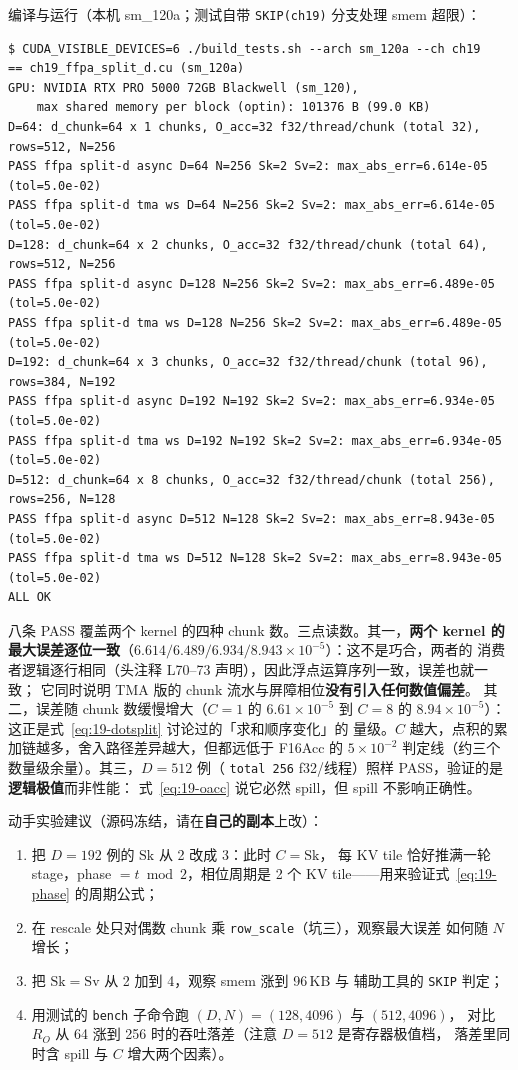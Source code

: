 编译与运行（本机 sm\_120a；测试自带 \texttt{SKIP(ch19)} 分支处理 smem 超限）：

\begin{lstlisting}[style=console]
$ CUDA_VISIBLE_DEVICES=6 ./build_tests.sh --arch sm_120a --ch ch19
== ch19_ffpa_split_d.cu (sm_120a)
GPU: NVIDIA RTX PRO 5000 72GB Blackwell (sm_120),
    max shared memory per block (optin): 101376 B (99.0 KB)
D=64: d_chunk=64 x 1 chunks, O_acc=32 f32/thread/chunk (total 32), rows=512, N=256
PASS ffpa split-d async D=64 N=256 Sk=2 Sv=2: max_abs_err=6.614e-05 (tol=5.0e-02)
PASS ffpa split-d tma ws D=64 N=256 Sk=2 Sv=2: max_abs_err=6.614e-05 (tol=5.0e-02)
D=128: d_chunk=64 x 2 chunks, O_acc=32 f32/thread/chunk (total 64), rows=512, N=256
PASS ffpa split-d async D=128 N=256 Sk=2 Sv=2: max_abs_err=6.489e-05 (tol=5.0e-02)
PASS ffpa split-d tma ws D=128 N=256 Sk=2 Sv=2: max_abs_err=6.489e-05 (tol=5.0e-02)
D=192: d_chunk=64 x 3 chunks, O_acc=32 f32/thread/chunk (total 96), rows=384, N=192
PASS ffpa split-d async D=192 N=192 Sk=2 Sv=2: max_abs_err=6.934e-05 (tol=5.0e-02)
PASS ffpa split-d tma ws D=192 N=192 Sk=2 Sv=2: max_abs_err=6.934e-05 (tol=5.0e-02)
D=512: d_chunk=64 x 8 chunks, O_acc=32 f32/thread/chunk (total 256), rows=256, N=128
PASS ffpa split-d async D=512 N=128 Sk=2 Sv=2: max_abs_err=8.943e-05 (tol=5.0e-02)
PASS ffpa split-d tma ws D=512 N=128 Sk=2 Sv=2: max_abs_err=8.943e-05 (tol=5.0e-02)
ALL OK
\end{lstlisting}

八条 PASS 覆盖两个 kernel 的四种 chunk 数。三点读数。其一，\textbf{两个 kernel 的
最大误差逐位一致}（$6.614/6.489/6.934/$\allowbreak$8.943\times10^{-5}$）：这不是巧合，两者的
消费者逻辑逐行相同（头注释 L70--73 声明），因此浮点运算序列一致，误差也就一致；
它同时说明 TMA 版的 chunk 流水与屏障相位\textbf{没有引入任何数值偏差}。
其二，误差随 chunk 数缓慢增大（$C{=}1$ 的 $6.61\times10^{-5}$ 到 $C{=}8$ 的
$8.94\times10^{-5}$）：这正是式~\ref{eq:19-dotsplit} 讨论过的「求和顺序变化」的
量级。$C$ 越大，点积的累加链越多，舍入路径差异越大，但都远低于 F16Acc 的
$5\times10^{-2}$ 判定线（约三个数量级余量）。其三，$D{=}512$ 例（
\texttt{total 256} f32/线程）照样 PASS，验证的是\textbf{逻辑极值}而非性能：
式~\ref{eq:19-oacc} 说它必然 spill，但 spill 不影响正确性。

动手实验建议（源码冻结，请在\textbf{自己的副本}上改）：

\begin{enumerate}[itemsep=2pt,topsep=2pt]
  \item 把 $D{=}192$ 例的 $\mathrm{Sk}$ 从 2 改成 3：此时 $C = \mathrm{Sk}$，
        每 KV tile 恰好推满一轮 stage，phase $= t \bmod 2$，相位周期是 2 个
        KV tile——用来验证式~\ref{eq:19-phase} 的周期公式；
  \item 在 rescale 处只对偶数 chunk 乘 \texttt{row\_scale}（坑三），观察最大误差
        如何随 $N$ 增长；
  \item 把 $\mathrm{Sk}=\mathrm{Sv}$ 从 2 加到 4，观察 smem 涨到 96\,KB 与
        辅助工具的 \texttt{SKIP} 判定；
  \item 用测试的 \texttt{bench} 子命令跑 $(D,N) = (128,4096)$ 与 $(512,4096)$，
        对比 $R_O$ 从 64 涨到 256 时的吞吐落差（注意 $D{=}512$ 是寄存器极值档，
        落差里同时含 spill 与 $C$ 增大两个因素）。
\end{enumerate}

